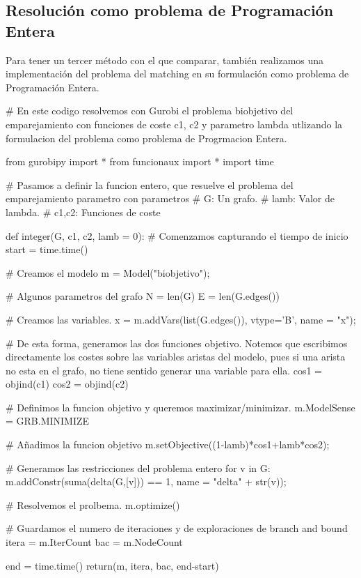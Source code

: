 \documentclass[twoside,a4paper,openright,12pt]{book}
\begin{document}
\subsection{Resolución como problema de Programación Entera}
Para tener un tercer método con el que comparar, también realizamos una implementación del problema del matching en su formulación como problema de Programación Entera.
\begin{pythone}
# En este codigo resolvemos con Gurobi el problema biobjetivo del emparejamiento con funciones de coste c1, c2 y parametro lambda utlizando la formulacion del problema como problema de Progrmacion Entera.

from gurobipy import *
from funcionaux import *
import time

# Pasamos a definir la funcion entero, que resuelve el problema del emparejamiento parametro con parametros
# G: Un grafo.
# lamb: Valor de lambda.
# c1,c2: Funciones de coste

def integer(G, c1, c2, lamb = 0):
 	# Comenzamos capturando el tiempo de inicio   
    start = time.time()
    
    # Creamos el modelo
    m = Model("biobjetivo");
   
    # Algunos parametros del grafo
    N = len(G)
    E = len(G.edges())
    
    # Creamos las variables.
    x = m.addVars(list(G.edges()), vtype='B', name = "x");
    
    # De esta forma, generamos las dos funciones objetivo. Notemos que escribimos directamente los costes sobre las variables aristas  del modelo, pues si una arista no esta en el grafo, no tiene sentido generar una variable para ella.       
    cos1 = objind(c1)
    cos2 = objind(c2)
    
    # Definimos la funcion objetivo y queremos maximizar/minimizar.
    m.ModelSense = GRB.MINIMIZE
    
    # Añadimos la funcion objetivo
    m.setObjective((1-lamb)*cos1+lamb*cos2); 
    
    # Generamos las restricciones del problema entero
    for v in G:
        m.addConstr(suma(delta(G,[v])) == 1, name = "delta" + str(v));
    
    # Resolvemos el prolbema.
    m.optimize()
    
    # Guardamos el numero de iteraciones y de exploraciones de branch and bound
    itera = m.IterCount
    bac = m.NodeCount
    
    end = time.time()
    return(m, itera, bac, end-start)
\end{pythone}
\newpage
\end{document}
